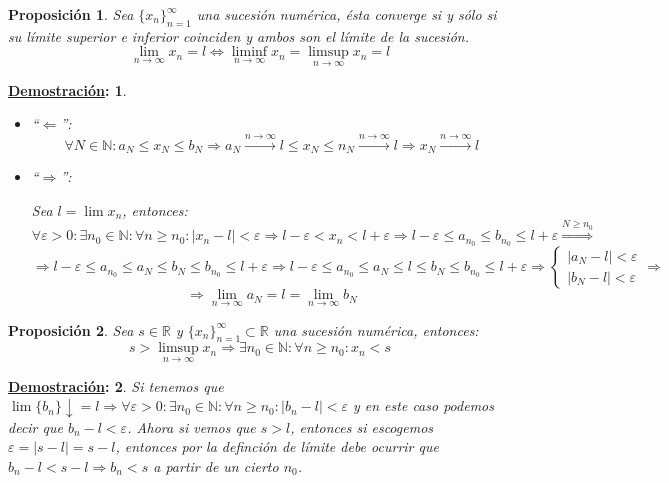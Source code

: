 \documentclass[10pt,a4paper,openright]{book}
\theoremstyle{break}
\newtheorem*{prop}{Proposición}
\newtheorem*{demo}{\underline{Demostración}:}
\begin{document}
\begin{prop}
Sea $\{x_n\}_{n=1}^\infty$ una sucesión numérica, ésta converge si y sólo si su límite superior e inferior coinciden y ambos son el límite de la sucesión.
$$\lim_{n\rightarrow \infty}x_n=l\Leftrightarrow \liminf_{n\rightarrow\infty}x_n= \limsup_{n\rightarrow\infty}x_n=l$$
\end{prop}
\begin{demo}
\begin{itemize}
\item ``$\Leftarrow$'':
$$\forall N\in \mathbb N: a_N\leq x_N \leq b_N\Rightarrow a_N\xrightarrow{n\rightarrow\infty} l\leq x_N\leq n_N\xrightarrow{n\rightarrow\infty} l\Rightarrow x_N\xrightarrow{n\rightarrow\infty} l$$

\item ``$\Rightarrow$'':\par
Sea $l=\lim x_n$, entonces:
$$\forall \varepsilon>0: \exists n_0\in \mathbb N : \forall n\geq n_0: |x_n-l|<\varepsilon\Rightarrow l-\varepsilon <x_n<l+\varepsilon\Rightarrow l-\varepsilon \leq a_{n_0} \leq b_{n_0}\leq l+\varepsilon\stackrel{N\geq n_0}{\Rightarrow}$$
$$\Rightarrow l-\varepsilon \leq a_{n_0} \leq a_N \leq b_N \leq b_{n_0} \leq l+\varepsilon\Rightarrow l-\varepsilon \leq a_{n_0} \leq a_N \leq l\leq b_N \leq b_{n_0} \leq l+\varepsilon\Rightarrow \begin{cases}|a_N-l|<\varepsilon \\ |b_N-l|<\varepsilon \end{cases}\Rightarrow$$
$$\Rightarrow \lim_{n\rightarrow\infty}a_N=l= \lim_{n\rightarrow\infty}b_N$$
\end{itemize}
\end{demo}

\begin{prop}
Sea $s\in \mathbb{R}$ y $\{x_n\}_{n=1}^\infty\subset \mathbb{R}$ una sucesión numérica, entonces:
$$s > \limsup_{n\rightarrow\infty} x_n \Rightarrow \exists n_0 \in \mathbb{N} : \forall n \geq n_0: x_n<s$$
\end{prop}
\begin{demo}
Si tenemos que $\lim \{b_n\}\downarrow = l\Rightarrow \forall \varepsilon>0 : \exists n_0\in \mathbb N: \forall n\geq n_0: |b_n-l|<\varepsilon $ y en este caso podemos decir que $b_n-l<\varepsilon$. Ahora si vemos que $s>l$, entonces si escogemos $\varepsilon = |s-l|=s-l$, entonces por la definción de límite debe ocurrir que $b_n-l<s-l\Rightarrow b_n<s$ a partir de un cierto $n_0$.
\end{demo}
\end{document}
